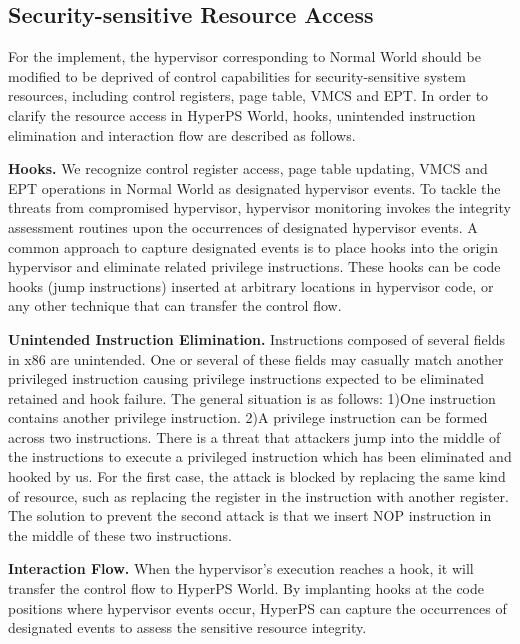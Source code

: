 \documentclass[conference]{IEEEtran}
\begin{document}
\subsection{Security-sensitive Resource Access}\label{IN}%


For the implement, the hypervisor corresponding to Normal World should be modified to be deprived of control capabilities for security-sensitive system resources, including control registers, page table, VMCS and EPT.
In order to clarify the resource access in HyperPS World, hooks, unintended instruction elimination and interaction flow are described as follows.

\textbf{Hooks.}
We recognize control register access, page table updating, VMCS and EPT operations in Normal World as designated hypervisor events.
To tackle the threats from compromised hypervisor, hypervisor monitoring invokes the integrity assessment routines upon the occurrences of designated hypervisor events. A common approach to capture designated events is to place hooks into the origin hypervisor and eliminate related privilege instructions. These hooks can be code hooks (jump instructions) inserted at arbitrary locations in hypervisor code, or any other technique that can transfer the control flow.


\textbf{Unintended Instruction Elimination.}
Instructions composed of several fields in x86 are unintended. One or several of these fields may casually match another privileged instruction causing privilege instructions expected to be eliminated retained and hook failure. The general situation is as follows: 1)One instruction contains another privilege instruction. 2)A privilege instruction can be formed across two instructions. There is a threat that attackers jump into the middle of the instructions to execute a privileged instruction which has been eliminated and hooked by us. 
For the first case, the attack is blocked by replacing the same kind of resource, such as replacing the register in the instruction with another register. The solution to prevent the second attack is that we insert NOP instruction in the middle of these two instructions.

\textbf{Interaction Flow.}
When the hypervisor's execution reaches a hook, it will transfer the control flow to HyperPS World. By implanting hooks at the code positions where hypervisor events occur, HyperPS can capture the occurrences of designated events to assess the sensitive resource integrity.
\end{document}
